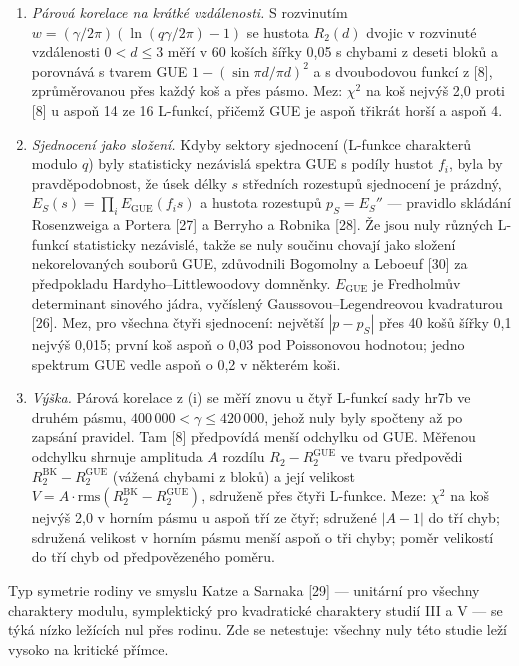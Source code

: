 \documentclass[
  10pt,
]{article}
\begin{document}
\begin{enumerate}
\def\labelenumi{(\roman{enumi})}
\item
  \emph{Párová korelace na krátké vzdálenosti.} S rozvinutím
  \(w = (\gamma/2\pi)(\ln(q\gamma/2\pi) - 1)\) se hustota \(R_2(d)\)
  dvojic v rozvinuté vzdálenosti \(0 < d \le 3\) měří v 60 koších šířky
  0,05 s chybami z deseti bloků a porovnává s tvarem GUE
  \(1 - (\sin\pi d/\pi d)^2\) a s dvoubodovou funkcí z {[}8{]},
  zprůměrovanou přes každý koš a přes pásmo. Mez: \(\chi^2\) na koš
  nejvýš 2,0 proti {[}8{]} u aspoň 14 ze 16 L-funkcí, přičemž GUE je
  aspoň třikrát horší a aspoň 4.
\item
  \emph{Sjednocení jako složení.} Kdyby sektory sjednocení (L-funkce
  charakterů modulo \(q\)) byly statisticky nezávislá spektra GUE s
  podíly hustot \(f_i\), byla by pravděpodobnost, že úsek délky \(s\)
  středních rozestupů sjednocení je prázdný,
  \(E_S(s) = \prod_i E_\mathrm{GUE}(f_i s)\) a hustota rozestupů
  \(p_S = E_S''\) --- pravidlo skládání Rosenzweiga a Portera {[}27{]} a
  Berryho a Robnika {[}28{]}. Že jsou nuly různých L-funkcí statisticky
  nezávislé, takže se nuly součinu chovají jako složení nekorelovaných
  souborů GUE, zdůvodnili Bogomolny a Leboeuf {[}30{]} za předpokladu
  Hardyho--Littlewoodovy domněnky. \(E_\mathrm{GUE}\) je Fredholmův
  determinant sinového jádra, vyčíslený Gaussovou--Legendreovou
  kvadraturou {[}26{]}. Mez, pro všechna čtyři sjednocení: největší
  \(|p - p_S|\) přes 40 košů šířky 0,1 nejvýš 0,015; první koš aspoň o
  0,03 pod Poissonovou hodnotou; jedno spektrum GUE vedle aspoň o 0,2 v
  některém koši.
\item
  \emph{Výška.} Párová korelace z (i) se měří znovu u čtyř L-funkcí sady
  hr7b ve druhém pásmu, \(400\,000 < \gamma \le 420\,000\), jehož nuly
  byly spočteny až po zapsání pravidel. Tam {[}8{]} předpovídá menší
  odchylku od GUE. Měřenou odchylku shrnuje amplituda \(A\) rozdílu
  \(R_2 - R_2^\mathrm{GUE}\) ve tvaru předpovědi
  \(R_2^\mathrm{BK} - R_2^\mathrm{GUE}\) (vážená chybami z bloků) a její
  velikost
  \(V = A\cdot\mathrm{rms}(R_2^\mathrm{BK} - R_2^\mathrm{GUE})\),
  sdruženě přes čtyři L-funkce. Meze: \(\chi^2\) na koš nejvýš 2,0 v
  horním pásmu u aspoň tří ze čtyř; sdružené \(|A - 1|\) do tří chyb;
  sdružená velikost v horním pásmu menší aspoň o tři chyby; poměr
  velikostí do tří chyb od předpovězeného poměru.
\end{enumerate}

Typ symetrie rodiny ve smyslu Katze a Sarnaka {[}29{]} --- unitární pro
všechny charaktery modulu, symplektický pro kvadratické charaktery
studií III a V --- se týká nízko ležících nul přes rodinu. Zde se
netestuje: všechny nuly této studie leží vysoko na kritické přímce.
\end{document}
